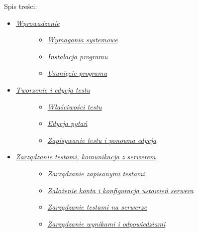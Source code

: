 \documentclass[letterpaper,10pt,polish]{sphinxmanual}
\begin{document}
Spis treści:
\begin{itemize}
\item {} \begin{description}
\item[{{\hyperref[index:wprowadzenie]{\emph{Wprowadzenie}}}}] \leavevmode\begin{itemize}
\item {} 
{\hyperref[index:wymagania-systemowe]{\emph{Wymagania systemowe}}}

\item {} 
{\hyperref[index:instalacja-programu]{\emph{Instalacja programu}}}

\item {} 
{\hyperref[index:usuniecie-programu]{\emph{Usunięcie programu}}}

\end{itemize}

\end{description}

\item {} \begin{description}
\item[{{\hyperref[index:tworzenie-edycja]{\emph{Tworzenie i edycja testu}}}}] \leavevmode\begin{itemize}
\item {} 
{\hyperref[index:wlasciwosci-testu]{\emph{Właściwości testu}}}

\item {} 
{\hyperref[index:edycja-pytan]{\emph{Edycja pytań}}}

\item {} 
{\hyperref[index:zapisywanie-testu]{\emph{Zapisywanie testu i ponowna edycja}}}

\end{itemize}

\end{description}

\item {} \begin{description}
\item[{{\hyperref[index:zarzadzanie-testami]{\emph{Zarządzanie testami, komunikacja z serwerem}}}}] \leavevmode\begin{itemize}
\item {} 
{\hyperref[index:zarzadzanie-zapisanymi]{\emph{Zarządzanie zapisanymi testami}}}

\item {} 
{\hyperref[index:zalozenie-konta]{\emph{Założenie konta i konfiguracja ustawień serwera}}}

\item {} 
{\hyperref[index:zarzadzanie-testami-na-serwerze]{\emph{Zarządzanie testami na serwerze}}}

\item {} 
{\hyperref[index:zarzadzanie-wynikami]{\emph{Zarządzanie wynikami i odpowiedziami}}}

\end{itemize}

\end{description}

\end{itemize}
\end{document}
